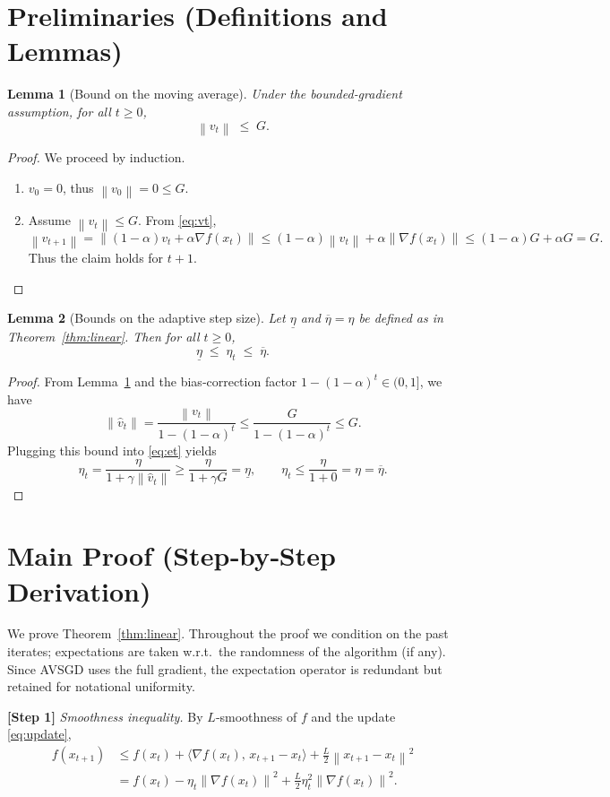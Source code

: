 \documentclass{article}
\newtheorem{lemma}{Lemma}
\newcommand{\norm}[1]{\left\lVert #1 \right\rVert}
\begin{document}
\section*{Preliminaries (Definitions and Lemmas)}

\begin{lemma}[Bound on the moving average]\label{lem:vtbound}
Under the bounded‑gradient assumption, for all $t\ge0$,
\[
\norm{v_{t}}\;\le\;G .
\]
\end{lemma}
\begin{proof}
We proceed by induction.
\begin{enumerate}
\item[Base case:] $v_{0}=0$, thus $\norm{v_{0}}=0\le G$.
\item[Inductive step:] Assume $\norm{v_{t}}\le G$. From \eqref{eq:vt},
\[
\norm{v_{t+1}}= \norm{(1-\alpha)v_{t}+ \alpha \nabla f(x_{t})}
\le (1-\alpha)\norm{v_{t}}+\alpha\norm{\nabla f(x_{t})}
\le (1-\alpha)G+\alpha G = G .
\]
Thus the claim holds for $t+1$.
\end{enumerate}
\end{proof}

\begin{lemma}[Bounds on the adaptive step size]\label{lem:stepbound}
Let $\underline{\eta}$ and $\overline{\eta}=\eta$ be defined as in Theorem~\ref{thm:linear}. Then for all $t\ge0$,
\[
\underline{\eta}\;\le\;\eta_{t}\;\le\;\overline{\eta}.
\]
\end{lemma}
\begin{proof}
From Lemma~\ref{lem:vtbound} and the bias‑correction factor $1-(1-\alpha)^{t}\in(0,1]$, we have
\[
\norm{\hat v_{t}} = \frac{\norm{v_{t}}}{1-(1-\alpha)^{t}}
\le \frac{G}{1-(1-\alpha)^{t}}\le G .
\]
Plugging this bound into \eqref{eq:et} yields
\[
\eta_{t}= \frac{\eta}{1+\gamma\norm{\hat v_{t}}}
\ge \frac{\eta}{1+\gamma G}= \underline{\eta},
\qquad
\eta_{t}\le \frac{\eta}{1+0}= \eta = \overline{\eta}.
\]
\end{proof}

\section*{Main Proof (Step‑by‑Step Derivation)}
We prove Theorem~\ref{thm:linear}. Throughout the proof we condition on the past iterates; expectations are taken w.r.t.\ the randomness of the algorithm (if any). Since AVSGD uses the full gradient, the expectation operator is redundant but retained for notational uniformity.

\noindent\textbf{[Step 1]} \emph{Smoothness inequality.}  
By $L$‑smoothness of $f$ and the update \eqref{eq:update},
\begin{align}
f(x_{t+1})
&\le f(x_{t}) + \langle \nabla f(x_{t}),\,x_{t+1}-x_{t}\rangle
      + \frac{L}{2}\norm{x_{t+1}-x_{t}}^{2} \nonumber\\
&= f(x_{t}) - \eta_{t}\norm{\nabla f(x_{t})}^{2}
   + \frac{L}{2}\eta_{t}^{2}\norm{\nabla f(x_{t})}^{2}.
\label{eq:smooth}
\end{align}
\end{document}
